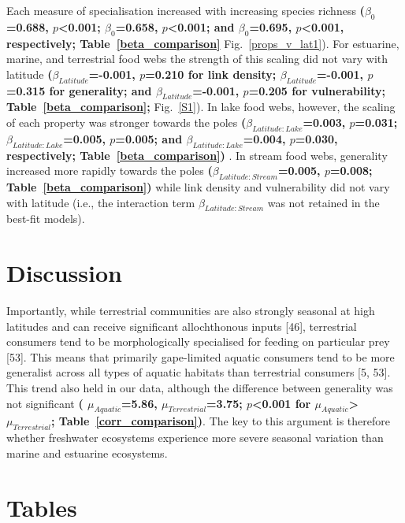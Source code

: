 \documentclass[12pt]{article}
\begin{document}
\begin{spacing}{2.0}
    Each measure of specialisation increased with increasing
    species richness 
    \textbf{($\beta_0$=0.688, $p$\textless0.001; $\beta_0$=0.658,
    $p$\textless0.001; and $\beta_0$=0.695, $p$\textless0.001, respectively; Table~\ref{beta_comparison}}
    Fig.~\ref{props_v_lat1}). For estuarine, marine, and terrestrial food webs the
    strength of this scaling did not vary with latitude
    \textbf{($\beta_{Latitude}$=-0.001, $p$=0.210 for link density;
    $\beta_{Latitude}$=-0.001, $p$=0.315 for generality; and
    $\beta_{Latitude}$=-0.001, $p$=0.205 for vulnerability; Table~\ref{beta_comparison};} 
    Fig.~\ref{S1}). In
    lake food webs, however, the scaling of each property was stronger towards
    the poles 
    \textbf{($\beta_{Latitude:Lake}$=0.003, $p$=0.031;
    $\beta_{Latitude:Lake}$=0.005, $p$=0.005; and
    $\beta_{Latitude:Lake}$=0.004, $p$=0.030, respectively; Table~\ref{beta_comparison})}
    . In stream food
    webs, generality increased more rapidly towards the poles
    \textbf{($\beta_{Latitude:Stream}$=0.005, $p$=0.008; Table~\ref{beta_comparison})}
    while link density and
    vulnerability did not vary with latitude (i.e., the interaction term 
    $\beta_{Latitude:Stream}$ was not retained in the best-fit models).    


\section*{Discussion}

  Importantly, while terrestrial communities are also strongly seasonal at
  high latitudes and can receive significant allochthonous
  inputs [46], terrestrial consumers tend to be
  morphologically specialised for feeding on particular prey [53].
  This means that primarily gape-limited aquatic consumers tend to be more
  generalist across all types of aquatic habitats than terrestrial 
  consumers [5, 53]. This trend also held in our data, although the difference between generality was not significant \textbf{(
    $\mu_{Aquatic}$=5.86, $\mu_{Terrestrial}$=3.75; $p$\textless0.001 for 
    $\mu_{Aquatic}$\textgreater$\mu_{Terrestrial}$; Table~\ref{corr_comparison})}. 
  The key to this argument is therefore whether freshwater ecosystems experience
  more severe seasonal variation than marine and estuarine ecosystems. 


% 
% 

\clearpage

\section*{Tables}


\end{spacing}
\end{document}
